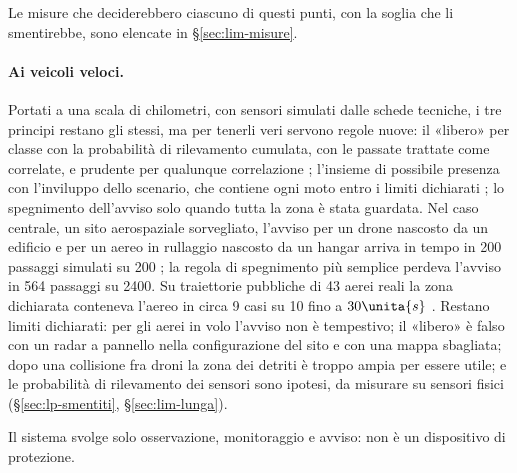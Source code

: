 Le misure che deciderebbero ciascuno di questi punti, con la soglia che li smentirebbe, sono elencate in \S\ref{sec:lim-misure}.

\paragraph{Ai veicoli veloci.} Portati a una scala di chilometri, con sensori simulati dalle schede tecniche, i tre principi restano gli stessi, ma per tenerli veri servono regole nuove: il «libero» per classe con la probabilità di rilevamento cumulata, con le passate trattate come correlate, e prudente per qualunque correlazione ; l'insieme di possibile presenza con l'inviluppo dello scenario, che contiene ogni moto entro i limiti dichiarati ; lo spegnimento dell'avviso solo quando tutta la zona è stata guardata. Nel caso centrale, un sito aerospaziale sorvegliato, l'avviso per un drone nascosto da un edificio e per un aereo in rullaggio nascosto da un hangar arriva in tempo in 200 passaggi simulati su 200 ; la regola di spegnimento più semplice perdeva l'avviso in 564 passaggi su 2400. Su traiettorie pubbliche di 43 aerei reali la zona dichiarata conteneva l'aereo in circa 9 casi su 10 fino a $30\unita{s}$ . %
Restano limiti dichiarati: per gli aerei in volo l'avviso non è tempestivo; il «libero» è falso con un radar a pannello nella configurazione del sito e con una mappa sbagliata; dopo una collisione fra droni la zona dei detriti è troppo ampia per essere utile; e le probabilità di rilevamento dei sensori sono ipotesi, da misurare su sensori fisici (\S\ref{sec:lp-smentiti}, \S\ref{sec:lim-lunga}).

Il sistema svolge solo osservazione, monitoraggio e avviso: non è un dispositivo di protezione.
